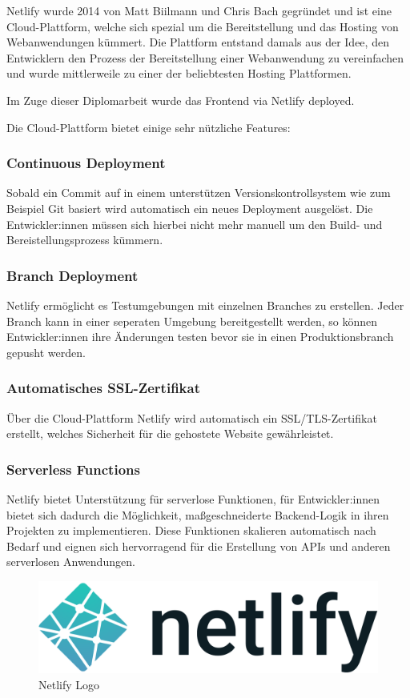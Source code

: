 
Netlify wurde 2014 von Matt Biilmann und Chris Bach gegründet und ist eine Cloud-Plattform, welche sich spezial um die Bereitstellung und das Hosting von Webanwendungen kümmert. Die Plattform entstand damals aus der Idee, den Entwicklern den Prozess der Bereitstellung einer Webanwendung zu vereinfachen und wurde mittlerweile zu einer der beliebtesten Hosting Plattformen.
\cite{Netlify}

Im Zuge dieser Diplomarbeit wurde das Frontend via Netlify deployed.

Die Cloud-Plattform bietet einige sehr nützliche Features:

\subsubsection{Continuous Deployment}
Sobald ein Commit auf in einem unterstützen Versionskontrollsystem wie zum Beispiel Git basiert wird automatisch ein neues Deployment ausgelöst. Die Entwickler:innen müssen sich hierbei nicht mehr manuell um den Build- und Bereistellungsprozess kümmern.

\subsubsection{Branch Deployment}
Netlify ermöglicht es Testumgebungen mit einzelnen Branches zu erstellen. Jeder Branch kann in einer seperaten Umgebung bereitgestellt werden, so können Entwickler:innen ihre Änderungen testen bevor sie in einen Produktionsbranch gepusht werden.

\subsubsection{Automatisches SSL-Zertifikat}
Über die Cloud-Plattform Netlify wird automatisch ein SSL/TLS-Zertifikat erstellt, welches Sicherheit für die gehostete Website gewährleistet.

\subsubsection{Serverless Functions}
Netlify bietet Unterstützung für serverlose Funktionen, für Entwickler:innen bietet sich dadurch die Möglichkeit, maßgeschneiderte Backend-Logik in ihren Projekten zu implementieren. Diese Funktionen skalieren automatisch nach Bedarf und eignen sich hervorragend für die Erstellung von APIs und anderen serverlosen Anwendungen.

\begin{figure}[h!]
    \centering
    \includegraphics[width=0.5\linewidth]{pics/netlify-logo.png}
    \caption{Netlify Logo}
    \label{fig:enter-label}
\end{figure}

\cite{Was_ist_Netlify}
